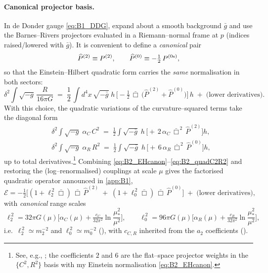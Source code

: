 \documentclass{iopjournal}
\begin{document}
\paragraph{Canonical projector basis.}
In de Donder gauge \eqref{eq:B1_DDG}, expand about a smooth background $\bar g$ and use the Barnes–Rivers projectors evaluated in a Riemann–normal frame at $p$ (indices raised/lowered with $\bar g$). It is convenient to define a \emph{canonical} pair
\[
\widehat P^{(2)}\equiv P^{(2)},
\qquad
\widehat P^{(0)}\equiv -\tfrac12\,P^{(0{\rm s})},
\]
so that the Einstein–Hilbert quadratic form carries the \emph{same} normalisation in both sectors:
\begin{equation}
\delta^2\!\int\!\sqrt{-g}\,\frac{R}{16\pi G}
\;=\;
\frac12\,\int d^4x\,\sqrt{-\bar g}\;h\,
\Big[-\tfrac12\,\bar\Box\,\big(\widehat P^{(2)}+\widehat P^{(0)}\big)\Big]\,h
\;+\;\text{(lower derivatives)}.
\label{eq:B2_EHcanon}
\end{equation}
With this choice, the quadratic variations of the curvature–squared terms take the diagonal form
\begin{equation}
\begin{aligned}
&\delta^2\!\int\!\sqrt{-g}\;\alpha_C\,C^2
\;=\;
\frac12\int\!\sqrt{-\bar g}\;h\,
\Big[+\,2\,\alpha_C\,\bar\Box^{\,2}\,\widehat P^{(2)}\Big]h,\\
&\delta^2\!\int\!\sqrt{-g}\;\alpha_R\,R^2
\;=\;
\frac12\int\!\sqrt{-\bar g}\;h\,
\Big[+\,6\,\alpha_R\,\bar\Box^{\,2}\,\widehat P^{(0)}\Big]h,
\end{aligned}
\label{eq:B2_quadC2R2}
\end{equation}
up to total derivatives.\footnote{See, e.g., \cite{Stelle1977,ParkerToms}; the coefficients $2$ and $6$ are the flat–space projector weights in the $\{C^2,R^2\}$ basis with my Einstein normalisation \eqref{eq:B2_EHcanon}.}
Combining \eqref{eq:B2_EHcanon}–\eqref{eq:B2_quadC2R2} and restoring the (log–renormalised) couplings at scale $\mu$ gives the factorised quadratic operator announced in \cref{app:B1},
\begin{equation}
\mathcal{E}
=-\tfrac12\Big[(1+\ell_2^{\,2}\bar\Box)\,\bar\Box\,\widehat P^{(2)}
\;+\;
(1+\ell_0^{\,2}\bar\Box)\,\bar\Box\,\widehat P^{(0)}\Big]
\;+\;\text{(lower derivatives)},
\label{eq:B2_factor_final}
\end{equation}
with \emph{canonical} range scales
\begin{equation}
\boxed{\
\ell_2^{\,2}=32\pi G(\mu)\Big[\alpha_C(\mu)+\tfrac{c_C}{32\pi^2}\ln\!\frac{\mu_*^2}{\mu^2}\Big],
\qquad
\ell_0^{\,2}=96\pi G(\mu)\Big[\alpha_R(\mu)+\tfrac{c_R}{32\pi^2}\ln\!\frac{\mu_*^2}{\mu^2}\Big],
}
\label{eq:B2_ranges}
\end{equation}
i.e.\ $\ell_2^{\,2}\!\simeq m_2^{-2}$ and $\ell_0^{\,2}\!\simeq m_0^{-2}$ (), with $c_{C,R}$ inherited from the $a_2$ coefficients ().
\end{document}
